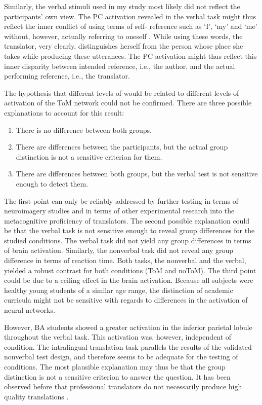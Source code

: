 \documentclass[output=paper]{LSP/langsci}
\begin{document}
\largerpage%
Similarly, the verbal stimuli used in my study most likely did not reflect the participants' own view. The PC activation revealed in the verbal task might thus reflect the inner conflict of using terms of self- reference such as `I', `my' and `me' without, however, actually referring to oneself \citep{Robinson2001Who, Hermans2007, Pym2005The}. While using these words, the translator, very clearly, distinguishes herself from the person whose place she takes while producing these utterances. The PC activation might thus reflect this inner disparity between intended reference, i.e., the author, and the actual performing reference, i.e., the translator.

The hypothesis that different levels of  would be related to different levels of activation of the ToM network could not be confirmed. There are three possible explanations to account for this result:

\begin{enumerate}
\item There is no difference between both groups.
\item There are differences between the participants, but the actual group distinction is not a sensitive criterion for them.
\item There are differences between both groups, but the verbal test is not sensitive enough to detect them.
\end{enumerate}

The first point can only be reliably addressed by further testing in terms of neuroimagery studies and in terms of other experimental research into the metacognitive proficiency of translators. The second possible explanation could be that the verbal task is not sensitive enough to reveal group differences for the studied conditions. The verbal task did not yield any group differences in terms of brain activation. Similarly, the nonverbal task did not reveal any group difference in terms of reaction time. Both tasks, the nonverbal and the verbal, yielded a robust contrast for both conditions (ToM and noToM). The third point could be due to a ceiling effect in the brain activation. Because all subjects were healthy young students of a similar age range, the distinction of academic curricula might not be sensitive with regards to differences in the activation of neural networks.

However, BA students showed a greater activation in the inferior parietal lobule throughout the verbal task. This activation was, however, independent of condition.
The intralingual translation task parallels the results of the validated nonverbal test design, and therefore seems to be adequate for the testing of conditions. The most plausible explanation may thus be that the group distinction is not a sensitive criterion to answer the question. It has been observed before that professional translators do not necessarily produce high quality translations \citep{Sun2014}. 
\end{document}
